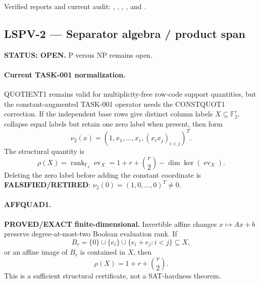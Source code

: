 \documentclass[11pt]{article}
\begin{document}
Verified reports and current audit:
,
,
,
, and
.

\subsection{LSPV-2 --- Separator algebra / product span}
\textbf{STATUS: OPEN.} P versus NP remains open.

\paragraph{Current TASK-001 normalization.}
QUOTIENT1 remains valid for multiplicity-free row-code support quantities, but the constant-augmented TASK-001 operator needs the CONSTQUOT1 correction.  If the independent base rows give distinct column labels \(X\subseteq\mathbb F_2^r\), collapse equal labels but retain one zero label when present, then form
\[
 \nu_2(x)=\left(1,x_1,\ldots,x_r,(x_ix_j)_{i<j}\right)^T.
\]
The structural quantity is
\[
 \rho(X)=\operatorname{rank}_{\mathbb F_2}\operatorname{ev}_X
 =1+r+\binom r2-\dim\ker(\operatorname{ev}_X).
\]
Deleting the zero label before adding the constant coordinate is \textbf{FALSIFIED/RETIRED}: \(\nu_2(0)=(1,0,\ldots,0)^T\neq0\).

\paragraph{AFFQUAD1.}
\textbf{PROVED/EXACT finite-dimensional.}  Invertible affine changes \(x\mapsto Ax+b\) preserve degree-at-most-two Boolean evaluation rank.  If
\[
 B_r=\{0\}\cup\{e_i\}\cup\{e_i+e_j:i<j\}\subseteq X,
\]
or an affine image of \(B_r\) is contained in \(X\), then
\[
 \rho(X)=1+r+\binom r2.
\]
This is a sufficient structural certificate, not a SAT-hardness theorem.
\end{document}
